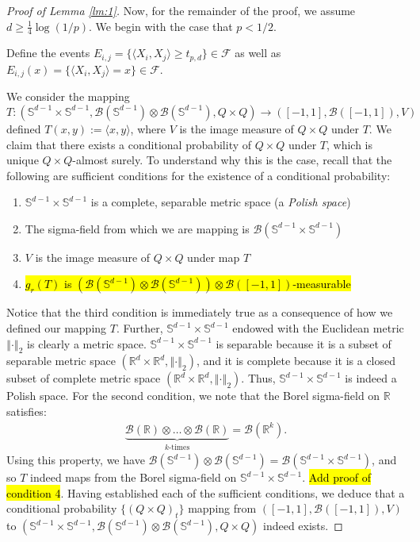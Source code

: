 \documentclass{article}
\begin{document}
\begin{proof}[Proof of Lemma \ref{lm:1}]
Now, for the remainder of the proof, we assume $d \geq \frac{1}{4}\log(1/p)$. We begin with the case that $p < 1/2$. 

Define the events $E_{i, j} = \{\langle X_i, X_j \rangle \geq t_{p, d}\} \in \mathcal{F}$ as well as $E_{i,j}(x) = \{ \langle X_i, X_j \rangle = x\} \in \mathcal{F}$. 

We consider the mapping $T: (\mathbb{S}^{d-1} \times \mathbb{S}^{d-1}, \mathcal{B}(\mathbb{S}^{d-1}) \otimes\mathcal{B}(\mathbb{S}^{d-1}), Q \times Q) \rightarrow ([-1, 1], \mathcal{B}([-1,1]), V)$ defined $T(x,y) := \langle x, y \rangle$, where $V$ is the image measure of $Q \times Q$ under $T$. We claim that there exists a conditional probability of $Q \times Q$ under $T$, which is unique $Q \times Q$-almost surely. To understand why this is the case, recall that the following are sufficient conditions for the existence of a conditional probability:
\begin{enumerate}
    \item $\mathbb{S}^{d-1} \times \mathbb{S}^{d-1}$ is a complete, separable metric space (a \textit{Polish space})
    \item The sigma-field from which we are mapping is $\mathcal{B}(\mathbb{S}^{d-1} \times \mathbb{S}^{d-1})$
    \item $V$ is the image measure of $Q \times Q$ under map $T$
    \item \hl{$g_r(T)$ is $\left( \mathcal{B}(\mathbb{S}^{d-1}) \otimes\mathcal{B}(\mathbb{S}^{d-1}) \right) \otimes \mathcal{B}([-1, 1])$-measurable}
\end{enumerate}
Notice that the third condition is immediately true as a consequence of how we defined our mapping $T$. Further, $\mathbb{S}^{d-1} \times \mathbb{S}^{d-1}$ endowed with the Euclidean metric $\left \Vert \cdot \right \Vert_2$ is clearly a metric space. $\mathbb{S}^{d-1} \times \mathbb{S}^{d-1}$ is separable because it is a subset of separable metric space $(\mathbb{R}^d \times \mathbb{R}^d, \left \Vert \cdot \right \Vert_2)$, and it is complete because it is a closed subset of complete metric space $(\mathbb{R}^d \times \mathbb{R}^d, \left \Vert \cdot \right \Vert_2)$. Thus, $\mathbb{S}^{d-1} \times \mathbb{S}^{d-1}$ is indeed a Polish space. For the second condition, we note that the Borel sigma-field on $\mathbb{R}$ satisfies:
\begin{align*}
    \underbrace{\mathcal{B}(\mathbb{R}) \otimes \ldots \otimes \mathcal{B}(\mathbb{R})}_{\text{$k$-times}} = \mathcal{B}(\mathbb{R}^k).
\end{align*}
Using this property, we have $\mathcal{B}(\mathbb{S}^{d-1}) \otimes\mathcal{B}(\mathbb{S}^{d-1}) = \mathcal{B}(\mathbb{S}^{d-1} \times \mathbb{S}^{d-1})$, and so $T$ indeed maps from the Borel sigma-field on $\mathbb{S}^{d-1} \times \mathbb{S}^{d-1}$. \hl{Add proof of condition 4}. Having established each of the sufficient conditions, we deduce that a conditional probability $\{ (Q \times Q)_t\}$ mapping from $([-1, 1], \mathcal{B}([-1,1]), V)$ to $(\mathbb{S}^{d-1} \times \mathbb{S}^{d-1}, \mathcal{B}(\mathbb{S}^{d-1}) \otimes\mathcal{B}(\mathbb{S}^{d-1}), Q \times Q)$ indeed exists.


\end{proof}
\end{document}
